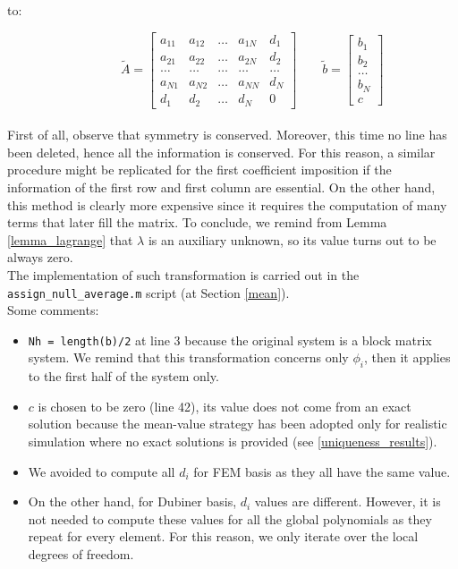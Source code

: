\documentclass[a4paper,11pt]{article}
\begin{document}
\noindent to:

\begin{equation*}
\quad \quad  \quad \, \tilde{A}=\begin{bmatrix}
a_{11} & a_{12} & \dots & a_{1N} & d_1\\ 
a_{21} & a_{22} & \dots & a_{2N} & d_2 \\ 
\dots & \dots & \dots & \dots & \dots \\
a_{N1}  & a_{N2} & \dots & a_{NN} & d_N \\
d_1 & d_2 & \dots & d_N & 0
\end{bmatrix} \quad \quad
\tilde{b}=\begin{bmatrix}
b_1 \\ b_2 \\ \dots \\ b_N \\ c
\end{bmatrix}
\end{equation*}
\vspace{3mm} \\
\noindent First of all, observe that symmetry is conserved. Moreover, this time no line has been deleted, hence all the information is conserved. For this reason, a similar procedure might be replicated for the first coefficient imposition if the information of the first row and first column are essential. On the other hand, this method is clearly more expensive since it requires the computation of many terms that later fill the matrix. To conclude, we remind from Lemma \ref{lemma_lagrange} that $\lambda$ is an auxiliary unknown, so its value turns out to be always zero. \\

\noindent The implementation of such transformation is carried out in the \texttt{assign\_null\_average.m} script (at Section \ref{mean}).\\
\vspace{2mm}
\noindent Some comments:
\begin{itemize}
	\item \texttt{Nh = length(b)/2} at line 3 because the original system is a block matrix system. We remind that this transformation concerns only $\phi_i$, then it applies to the first half of the system only.
	\item $c$ is chosen to be zero (line 42), its value does not come from an exact solution because the mean-value strategy has been adopted only for realistic simulation where no exact solutions is provided (see \ref{uniqueness_results}). 
	\item We avoided to compute all $d_i$ for FEM basis as they all have the same value.
	\item On the other hand, for Dubiner basis, $d_i$ values are different. However, it is not needed to compute these values for all the global polynomials as they repeat for every element. For this reason, we only iterate over the local degrees of freedom.
\end{itemize}
\end{document}
